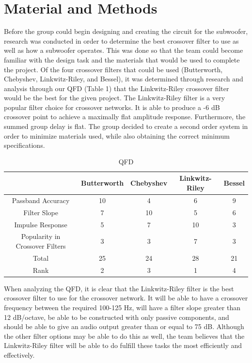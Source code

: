 \documentclass{article}
\begin{document}
\section{Material and Methods}
Before the group could begin designing and creating the circuit for the subwoofer, research was conducted in order to determine the best crossover filter to use as well as how a subwoofer operates. This was done so that the team could become familiar with the design task and the materials that would be used to complete the project. Of the four crossover filters that could be used (Butterworth, Chebyshev, Linkwitz-Riley, and Bessel), it was determined through research and analysis through our QFD (Table 1) that the Linkwitz-Riley crossover filter would be the best for the given project. The Linkwitz-Riley filter is a very popular filter choice for crossover networks. It is able to produce a -6 dB crossover point to achieve a maximally flat amplitude response. Furthermore, the summed group delay is flat. The group decided to create a second order system in order to minimize materials used, while also obtaining the correct minimum specifications. 

\begin{table}[h]
\begin{center}
\begin{tabular}{c|c|c|c|c}
& Butterworth & Chebyshev & Linkwitz-Riley & Bessel\\
\hline
Passband Accuracy & 10 & 4 & 6 & 9\\
\hline
Filter Slope & 7 & 10 & 5 & 6\\
\hline
Impulse Response & 5 & 7 & 10 & 3\\
\hline
Popularity in Crossover Filters & 3 & 3 & 7 & 3\\
\hline
Total & 25 & 24 & 28 & 21\\
\hline
Rank & 2 & 3 & 1 & 4\\
\end{tabular}
\caption{QFD}
\end{center}
\end{table}

When analyzing the QFD, it is clear that the Linkwitz-Riley filter is the best crossover filter to use for the crossover network. It will be able to have a crossover frequency between the required 100-125 Hz, will have a filter slope greater than 12 dB/octave, be able to be constructed with only passive components, and should be able to give an audio output greater than or equal to 75 dB. Although the other filter options may be able to do this as well, the team believes that the Linkwitz-Riley filter will be able to do fulfill these tasks the most efficiently and effectively.
\end{document}
